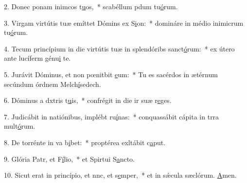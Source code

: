 2. Donec ponam inimcos t\uline{u}os,~* scabéllum pdum tu\uline{ó}rum.\par 
3. Virgam virtútis tuæ emíttet Dómins ex S\uline{i}on:~* domináre in médio inimicrum tu\uline{ó}rum.\par 
4. Tecum princípium in die virtútis tuæ in splendóribs sanct\uline{ó}rum:~* ex útero ante lucíferm génu\uline{i} te.\par 
5. Jurávit Dóminus, et non pœnitbit \uline{e}um:~* Tu es sacérdos in ætérnum secúndum órdnem Melch\uline{í}sedech.\par 
6. Dóminus a dxtris t\uline{u}is,~* confrégit in die ir suæ r\uline{e}ges.\par 
7. Judicábit in natiónibus, implébt ru\uline{í}nas:~* conquassábit cápita in trra mult\uline{ó}rum.\par 
8. De torrénte in va b\uline{i}bet:~* proptérea exltábit c\uline{a}put.\par 
9. Glória Patr, et F\uline{í}lio,~* et Spirtui S\uline{a}ncto.\par 
10. Sicut erat in princípio, et nnc, et s\uline{e}mper,~* et in sǽcula sæclórum. \uline{A}men.\par 
